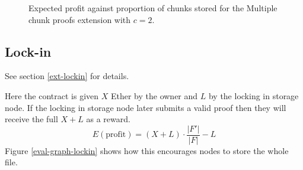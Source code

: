 \documentclass[12pt,a4paper,twoside,openright]{report}
\begin{document}
\begin{figure}[H] %
\caption[Expected attacker profit: multiple chunk proofs]{Expected profit against proportion of chunks stored for the Multiple chunk proofs extension with $c = 2$.}
\label{fig:eval-graph-multi}
\end{figure}




\subsection{Lock-in}

See section \ref{ext-lockin} for details.

Here the contract is given $X$ Ether by the owner and $L$ by the locking in storage node.
If the locking in storage node later submits a valid proof then they will receive the full $X + L$ as a reward.
\[E(\text{profit}) = (X + L) \cdot \frac{|F'|}{|F|} - L\]
Figure \ref{eval-graph-lockin} shows how this encourages nodes to store the whole file.
\end{document}
